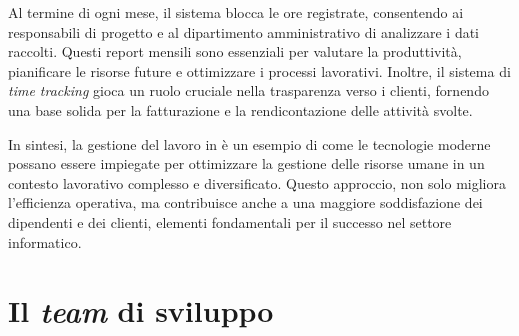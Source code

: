 \noindent Al termine di ogni mese, il sistema blocca le ore registrate, consentendo ai responsabili di progetto e al dipartimento amministrativo 
di analizzare i dati raccolti. Questi report mensili sono essenziali per valutare la produttività, pianificare le risorse future e ottimizzare 
i processi lavorativi. Inoltre, il sistema di \textit{time tracking} gioca un ruolo cruciale nella trasparenza verso i clienti, 
fornendo una base solida per la fatturazione e la rendicontazione delle attività svolte.

\noindent In sintesi, la gestione del lavoro in \azienda{} è un esempio di come le tecnologie moderne possano essere impiegate per 
ottimizzare la gestione delle risorse umane in un contesto lavorativo complesso e diversificato. Questo approccio, non solo migliora 
l'efficienza operativa, ma contribuisce anche a una maggiore soddisfazione dei dipendenti e dei clienti, elementi fondamentali per il 
successo nel settore informatico.
\newpage

\section{Il \textit{team} di sviluppo}

